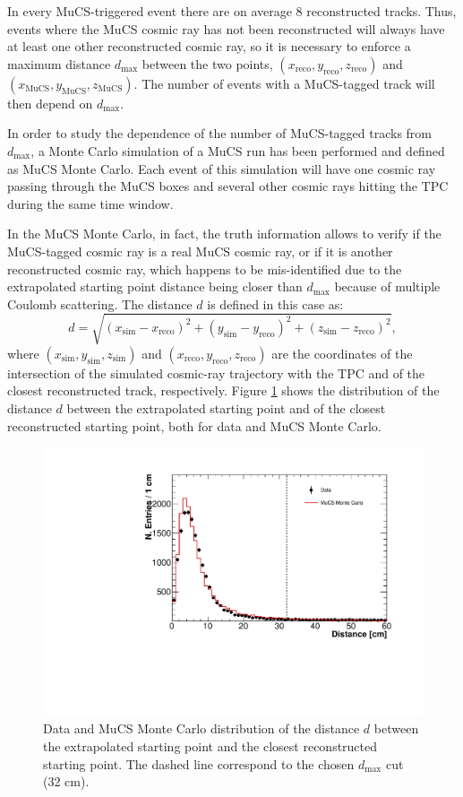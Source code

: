 \documentclass[a4paper,11pt]{article}
\begin{document}
In every MuCS-triggered event there are on average 8 reconstructed tracks. Thus, events where the MuCS cosmic ray has not been reconstructed will always have at least one other reconstructed cosmic ray, so it is necessary to enforce a maximum distance $d_{\mathrm{max}}$ between the two points, $(x_{\mathrm{reco}},y_{\mathrm{reco}},z_{\mathrm{reco}})$ and $(x_{\mathrm{MuCS}},y_{\mathrm{MuCS}},z_{\mathrm{MuCS}})$. The number of events with a MuCS-tagged track will then depend on $d_{\mathrm{max}}$.

In order to study the dependence of the number of MuCS-tagged tracks from $d_{\mathrm{max}}$, a Monte Carlo simulation of a MuCS run has been performed and defined as MuCS Monte Carlo. Each event of this simulation will have one cosmic ray passing through the MuCS boxes and several other cosmic rays hitting the TPC during the same time window.

In the MuCS Monte Carlo, in fact, the truth information allows to verify if the MuCS-tagged cosmic ray is a real MuCS cosmic ray, or if it is another reconstructed cosmic ray, which happens to be mis-identified due to the extrapolated starting point distance being closer than $d_{\mathrm{max}}$ because of multiple Coulomb scattering.
The distance $d$ is defined in this case as:
\begin{equation}\label{eq:d_mc}
d = \sqrt{(x_{\mathrm{sim}}-x_{\mathrm{reco}})^2+(y_{\mathrm{sim}}-y_{\mathrm{reco}})^2+(z_{\mathrm{sim}}-z_{\mathrm{reco}})^2},
\end{equation}
where $(x_{\mathrm{sim}},y_{\mathrm{sim}},z_{\mathrm{sim}})$ and $(x_{\mathrm{reco}},y_{\mathrm{reco}},z_{\mathrm{reco}})$ are the coordinates of the intersection of the simulated cosmic-ray trajectory with the TPC and of the closest reconstructed track, respectively. Figure \ref{fig:dist} shows the distribution of the distance $d$ between the extrapolated starting point and of the closest reconstructed starting point, both for data and MuCS Monte Carlo.

\begin{figure}[htbp]
  \begin{center}
    \includegraphics[width=0.7\linewidth]{figures/dist.pdf}
    \caption{Data and MuCS Monte Carlo distribution of the distance $d$ between the extrapolated starting point and the closest reconstructed starting point. The dashed line correspond to the chosen $d_{\mathrm{max}}$ cut (32 cm).} \label{fig:dist}
  \end{center}
\end{figure}
\end{document}
